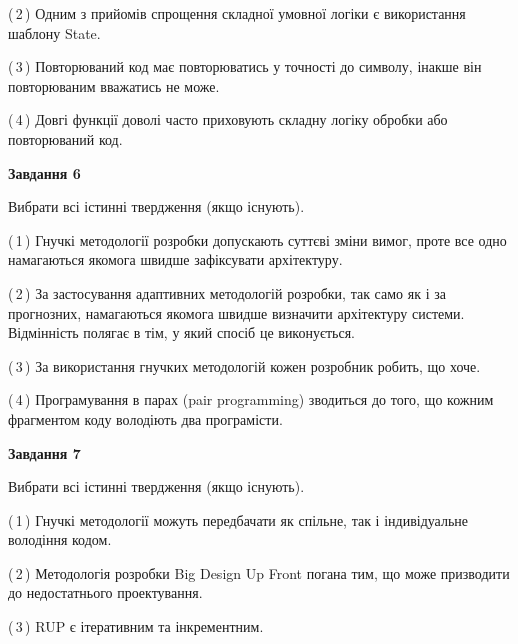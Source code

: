 \documentclass[10pt, ukrainian]{article}
\begin{document}
{\begin {large}
(\,2\,) Одним з прийомів спрощення складної умовної логіки є використання шаблону State. %



(\,3\,) Повторюваний код має повторюватись у точності до символу, інакше він повторюваним вважатись не може. %



(\,4\,) Довгі функції доволі часто приховують складну логіку обробки або повторюваний код. %

\newpage

{\begin {center}\textbf{Завдання 6}\end {center}}\par
Вибрати всі істинні твердження (якщо існують).\par
\vspace{2mm}



(\,1\,) Гнучкі методології розробки допускають суттєві зміни вимог, проте все одно намагаються якомога швидше зафіксувати архітектуру. %



(\,2\,) За застосування адаптивних методологій розробки, так само як і за прогнозних, намагаються якомога швидше визначити архітектуру системи. Відмінність полягає в тім, у який спосіб це виконується.%



(\,3\,) За використання гнучких методологій кожен розробник робить, що хоче. %



(\,4\,) Програмування в парах (pair programming) зводиться до того, що кожним фрагментом коду володіють два програмісти. %


{\begin {center}\textbf{Завдання 7}\end {center}}\par
Вибрати всі істинні твердження (якщо існують).\par
\vspace{2mm}



(\,1\,) Гнучкі методології можуть передбачати як спільне, так і індивідуальне володіння кодом. %



(\,2\,) Методологія розробки Big Design Up Front погана тим, що може призводити до недостатнього проектування.%



(\,3\,) RUP є ітеративним та інкрементним.%




\end{large}}
\end{document}
